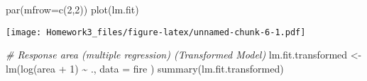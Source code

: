 \documentclass[
]{article}
\newenvironment{Shaded}{\begin{snugshade}}{\end{snugshade}}
\newcommand{\AttributeTok}[1]{\textcolor[rgb]{0.77,0.63,0.00}{#1}}
\newcommand{\CommentTok}[1]{\textcolor[rgb]{0.56,0.35,0.01}{\textit{#1}}}
\newcommand{\DecValTok}[1]{\textcolor[rgb]{0.00,0.00,0.81}{#1}}
\newcommand{\FunctionTok}[1]{\textcolor[rgb]{0.00,0.00,0.00}{#1}}
\newcommand{\NormalTok}[1]{#1}
\newcommand{\OtherTok}[1]{\textcolor[rgb]{0.56,0.35,0.01}{#1}}
\newcommand{\SpecialCharTok}[1]{\textcolor[rgb]{0.00,0.00,0.00}{#1}}
\begin{document}
\begin{Shaded}
\begin{Highlighting}[]
\FunctionTok{par}\NormalTok{(}\AttributeTok{mfrow=}\FunctionTok{c}\NormalTok{(}\DecValTok{2}\NormalTok{,}\DecValTok{2}\NormalTok{))}
\FunctionTok{plot}\NormalTok{(lm.fit)}
\end{Highlighting}
\end{Shaded}

\texttt{[image: Homework3\_files/figure-latex/unnamed-chunk-6-1.pdf]}

\begin{Shaded}
\begin{Highlighting}[]
\CommentTok{\# Response area (multiple regression) (Transformed Model)}
\NormalTok{lm.fit.transformed }\OtherTok{\textless{}{-}} \FunctionTok{lm}\NormalTok{(}\FunctionTok{log}\NormalTok{(area }\SpecialCharTok{+} \DecValTok{1}\NormalTok{) }\SpecialCharTok{\textasciitilde{}}\NormalTok{ ., }\AttributeTok{data =}\NormalTok{ fire )}
\FunctionTok{summary}\NormalTok{(lm.fit.transformed)}
\end{Highlighting}
\end{Shaded}
\end{document}

